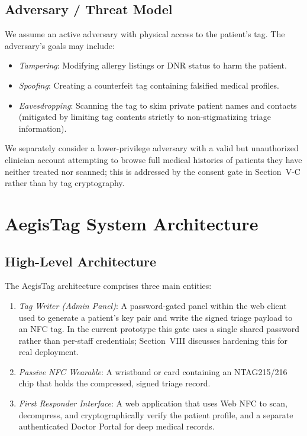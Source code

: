 \documentclass[conference]{IEEEtran}
\begin{document}
\subsection{Adversary / Threat Model}
We assume an active adversary with physical access to the patient's tag. The adversary's goals may include:
\begin{itemize}
\item \textit{Tampering}: Modifying allergy listings or DNR status to harm the patient.
\item \textit{Spoofing}: Creating a counterfeit tag containing falsified medical profiles.
\item \textit{Eavesdropping}: Scanning the tag to skim private patient names and contacts (mitigated by limiting tag contents strictly to non-stigmatizing triage information).
\end{itemize}
We separately consider a lower-privilege adversary with a valid but unauthorized clinician account attempting to browse full medical histories of patients they have neither treated nor scanned; this is addressed by the consent gate in Section~V-C rather than by tag cryptography.

\section{AegisTag System Architecture}
\subsection{High-Level Architecture}
The AegisTag architecture comprises three main entities:
\begin{enumerate}
\item \textit{Tag Writer (Admin Panel)}: A password-gated panel within the web client used to generate a patient's key pair and write the signed triage payload to an NFC tag. In the current prototype this gate uses a single shared password rather than per-staff credentials; Section~VIII discusses hardening this for real deployment.
\item \textit{Passive NFC Wearable}: A wristband or card containing an NTAG215/216 chip that holds the compressed, signed triage record.
\item \textit{First Responder Interface}: A web application that uses Web NFC to scan, decompress, and cryptographically verify the patient profile, and a separate authenticated Doctor Portal for deep medical records.
\end{enumerate}
\end{document}
